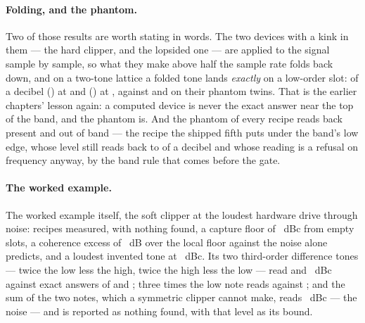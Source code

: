 \documentclass[11pt,a4paper]{article}
\begin{document}
\paragraph{Folding, and the phantom.} Two of those results are worth stating in words. The two devices with a
kink in them --- the hard clipper, and the lopsided one --- are applied to
the signal sample by sample, so what they make above half the sample
rate folds back down, and on a two-tone lattice a folded tone lands
\emph{exactly} on a low-order slot: \iparityHardclipAliasWords{} of a
decibel (\iparityHardclipAlias{}) at \iparityHardclipAliasAt{} and
\iparityAsymAliasWords{} (\iparityAsymAlias{}) at \iparityAsymAliasAt{},
against \iparityHardclipTwinWords{} and \iparityAsymTwinWords{} on their
phantom twins. That is the earlier chapters' lesson again: a computed
device is never the exact answer near the top of the band, and the
phantom is. And the phantom of every recipe reads back
\iparityPhantomPresent{} present and \iparityPhantomOutOfBand{} out of
band --- the recipe the shipped fifth puts under the band's low edge,
whose level still reads back to \iparityPhantomWorstWords{} of a
decibel and whose reading is a refusal on frequency anyway, by the band
rule that comes before the gate.

\paragraph{The worked example.} The worked example itself, the soft clipper at the loudest hardware
drive through noise: \iparityWorkedPresent{} recipes measured,
\iparityWorkedAbsent{} with nothing found, a capture floor of
\iparityWorkedFloor{}~dBc from \iparityWorkedFloorBins{} empty slots, a
coherence excess of \iparityWorkedCoherenceExcess{}~dB over the local
floor against the \iparityCleanExpected{} noise alone predicts, and a
loudest invented tone at \iparityWorkedLoudest{}~dBc. Its two
third-order difference tones --- twice the low less the high, twice the
high less the low --- read \iparityWorkedTwoFOneMinusFTwoLevel{} and
\iparityWorkedTwoFTwoMinusFOneLevel{}~dBc against exact answers of
\iparityWorkedTwoFOneMinusFTwoTruth{} and
\iparityWorkedTwoFTwoMinusFOneTruth{}; three times the low note reads
\iparityWorkedThreeFOneLevel{} against \iparityWorkedThreeFOneTruth{};
and the sum of the two notes, which a symmetric clipper cannot make,
reads \iparityWorkedFOnePlusFTwoLevel{}~dBc --- the noise --- and is
reported as nothing found, with that level as its bound.
\end{document}
